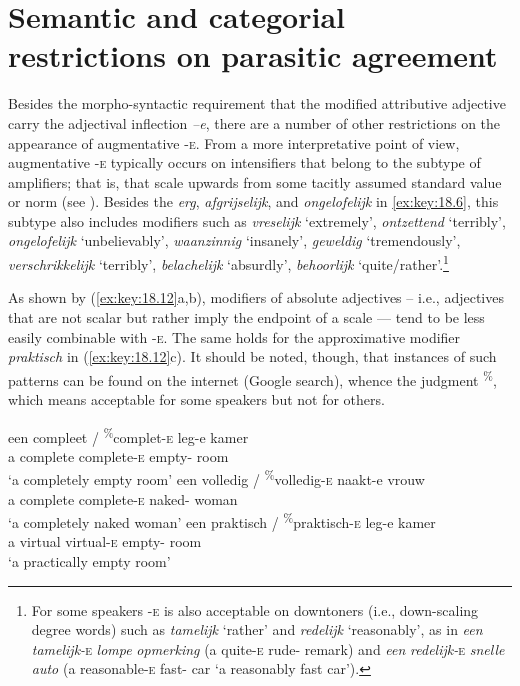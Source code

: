 \documentclass[output=paper]{langsci/langscibook}
\begin{document}
\section{Semantic and categorial restrictions on parasitic
agreement}\label{sec:key:18.3}

Besides the morpho-syntactic requirement that the modified attributive
adjective carry the adjectival inflection \emph{–e}, there are a number of
other restrictions on the appearance of augmentative \textsc{-e}. From a more
interpretative point of view, augmentative \textsc{-e} typically occurs on
intensifiers that belong to the subtype of amplifiers; that is, 
that scale upwards from some tacitly assumed standard value or norm (see
\citealt[104]{Broekhuis2013}). Besides the  \emph{erg},
\emph{afgrijselijk}, and \emph{ongelofelijk} in \eqref{ex:key:18.6}, this subtype
also includes modifiers such as \emph{vreselijk} \enquote*{extremely},
\emph{ontzettend} \enquote*{terribly}, \emph{ongelofelijk}
\enquote*{unbelievably}, \emph{waanzinnig} \enquote*{insanely}, \emph{geweldig}
\enquote*{tremendously}, \emph{verschrikkelijk} \enquote*{terribly},
\emph{belachelijk} \enquote*{absurdly}, \emph{behoor\-lijk}
\enquote*{quite/rather}.\footnote{For some speakers \textsc{-e} is also
    acceptable on downtoners (i.e., down-scaling degree words) such as
    \emph{tamelijk} \enquote*{rather} and \emph{redelijk}
    \enquote*{reasonably}, as in \emph{een} \emph{tamelijk-}\textsc{e}
    \emph{lompe} \emph{opmerking} (a quite-\textsc{e} rude-\Agr{} remark) and
\emph{een} \emph{redelijk-}\textsc{e} \emph{snelle} \emph{auto} (a
reasonable-\textsc{e} fast-\Agr{} car \enquote*{a reasonably fast car}).}

As shown by (\ref{ex:key:18.12}a,b), modifiers of absolute adjectives – i.e.,
adjectives that are not scalar but rather imply the endpoint of a scale — tend
to be less easily combinable with \textsc{-e}. The same holds for the
approximative modifier \emph{praktisch} in (\ref{ex:key:18.12}c). It should be
noted, though, that instances of such patterns can be found on the internet
(Google search), whence the judgment \textsuperscript{\%}, which means
acceptable for some speakers but not for others.

\ea%
    \label{ex:key:18.12}
	\ea
	\gll  een    compleet / \textsuperscript{\%}complet-\textsc{e}    leg-e            kamer\\
    a        complete {} \hphantom{\textsuperscript{\%}}complete-\textsc{e}      empty-\Agr{}  room\\
	\glt \enquote*{a completely empty room}
	\ex
	\gll een    volledig / \textsuperscript{\%}volledig-\textsc{e}        naakt-e        vrouw\\
    a        complete {} \hphantom{\textsuperscript{\%}}complete-\textsc{e} naked-\Agr{}  woman\\
    \glt \enquote*{a completely naked woman}
	\ex
	\gll  een    praktisch / \textsuperscript{\%}praktisch-\textsc{e}    leg-e            kamer\\
            a        virtual {} \hphantom{\textsuperscript{\%}}virtual-\textsc{e} empty-\Agr{}  room\\
    \glt \enquote*{a practically empty room}
	\z
\z
\end{document}
